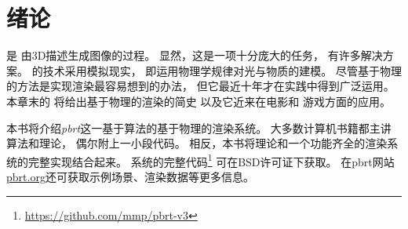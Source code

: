 
\chapter{绪论}\label{chap:绪论}
\setcounter{sidenote}{1}

是
由3D描述生成图像的过程。
显然，这是一项十分庞大的任务，
有许多解决方案。
的技术采用模拟现实，
即运用物理学规律对光与物质的建模。
尽管基于物理的方法是实现渲染最容易想到的办法，
但它最近十年才在实践中得到广泛运用。
本章末的
将给出基于物理的渲染的简史
以及它近来在电影和
游戏方面的应用。

本书将介绍\emph{pbrt}这一基于算法的基于物理的渲染系统。
大多数计算机书籍都主讲算法和理论，
偶尔附上一小段代码。
相反，本书将理论和一个功能齐全的渲染系统的完整实现结合起来。
系统的完整代码\footnote{\url{https://github.com/mmp/pbrt-v3}}
可在BSD许可证下获取。
在pbrt网站\href{https://pbrt.org}{\ttfamily pbrt.org}还可获取示例场景、渲染数据等更多信息。

















